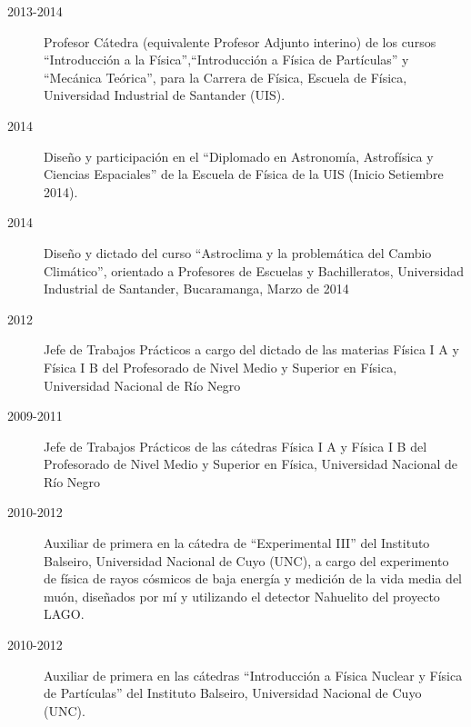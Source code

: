 \begin{description}
	\item [2013-2014] Profesor Cátedra (equivalente Profesor Adjunto interino) de los cursos ``Introducción a la Física'',``Introducción a Física de Partículas'' y ``Mecánica Teórica'', para la Carrera de Física, Escuela de Física, Universidad Industrial de Santander (UIS).
    \item [2014] Diseño y participación en el ``Diplomado en Astronomía, Astrofísica y Ciencias Espaciales'' de la Escuela de Física de la UIS (Inicio Setiembre 2014).
	\item [2014] Diseño y dictado del curso ``Astroclima y la problemática del Cambio Climático'', orientado a Profesores de Escuelas y Bachilleratos, Universidad Industrial de Santander, Bucaramanga, Marzo de 2014
	\item [2012] Jefe de Trabajos Prácticos a cargo del dictado de las materias Física I A y Física I B del Profesorado de Nivel Medio y Superior en Física, Universidad Nacional de Río Negro
	\item [2009-2011] Jefe de Trabajos Prácticos de las cátedras Física I A y Física I B del Profesorado de Nivel Medio y Superior en Física, Universidad Nacional de Río Negro
	\item [2010-2012] Auxiliar de primera en la cátedra de ``Experimental III'' del Instituto Balseiro, Universidad Nacional de Cuyo (UNC), a cargo del experimento de física de rayos cósmicos de baja energía y medición de la vida media del muón, diseñados por mí y utilizando el detector Nahuelito del proyecto LAGO\@.
	\item [2010-2012] Auxiliar de primera en las cátedras ``Introducción a Física Nuclear y Física de Partículas'' del Instituto Balseiro, Universidad Nacional de Cuyo (UNC).
\fi
\end{description}
\fi